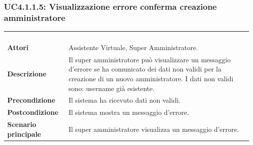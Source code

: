 \subsubsection{UC4.1.1.5: Visualizzazione errore conferma creazione amministratore}
\label{UC4.1.1.5}
\begin{longtable}{l|p{10cm}}
	\rowcolor[gray]{0.8} \multicolumn{2}{c}{} \\
	\rowcolor[gray]{0.8} \multicolumn{2}{c}{\textbf{UC4.1.1.5 - Visualizzazione errore conferma creazione amministratore}} \\
	\rowcolor[gray]{0.8} \multicolumn{2}{c}{} \\
	\hline
	&\\
	\textbf{Attori} & Assistente Virtuale, Super Amministratore.\\[7pt]
	\textbf{Descrizione} & Il super amministratore può visualizzare un messaggio d'errore se ha comunicato dei dati non validi per la creazione di un nuovo amministratore.
	I dati non validi sono: username già esistente.\\[7pt]
	\textbf{Precondizione} & Il sistema ha ricevuto dati non validi.\\[7pt]
	\textbf{Postcondizione} & Il sistema mostra un messaggio d'errore.\\[7pt]
	\textbf{Scenario principale} &Il super amministratore visualizza un messaggio d'errore.\\[7pt]\hline
\end{longtable}

